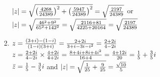 \documentclass[12pt]{amsart}
\begin{document}
\begin{enumerate}
\begin{enumerate}
				$|z|=\sqrt{\big({4268 \over 24389} \big)^2+\big({5947 \over 24389}\big)^2}=
				\sqrt{2197 \over 24389}$ or\\
				
				$|z|=\sqrt{46^2+9^2 \over 65^2+142^2} =\sqrt{2116+81 \over 4225+20164}=
				\sqrt{2197 \over 24389}$\\
			
			\item $z={(3+i)-(1-i) \over (1-i)(3+i)}={2+2i \over 3+i-3i-i^2}={2+2i \over 4-2i}$\\
			
				$z={2+2i \over 4-2i} \times {4+2i \over 4+2i}={8+4i+8i+4i^2 \over 16+4}={4+12i \over 20}=
				{1 \over 5}+{3 \over 5}i$\\
				
				$\bar z={1 \over 5}-{3 \over 5}i$ and $|z|=\sqrt{{1 \over 25}+{9 \over 25}} = 
				{\sqrt{10} \over 5}$\\
			

\end{enumerate}
\end{enumerate}
\end{document}
